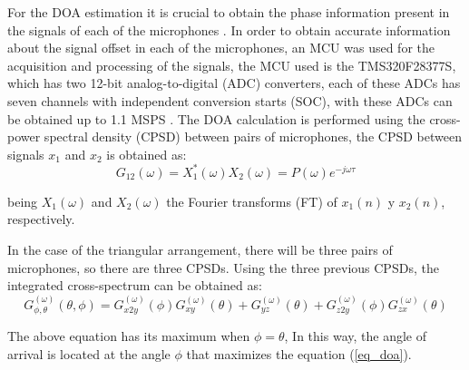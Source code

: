 \documentclass{llncs}
\begin{document}
For the DOA estimation it is crucial to obtain the phase information present in the signals of each of the microphones \cite{karbasi2006}. In order to obtain accurate information about the signal offset in each of the microphones, an MCU was used for the acquisition and processing of the signals, the MCU used is the TMS320F28377S, which has two 12-bit analog-to-digital (ADC) converters, each of these ADCs has seven channels with independent conversion starts (SOC), with these ADCs can be obtained up to 1.1 MSPS \cite{DTASHT2}. The DOA calculation is performed using the cross-power spectral density (CPSD) between pairs of microphones, the CPSD between signals  $x_1$ and $x_2$ is obtained as:
\begin{equation}
	G_{12}(\omega) = X_1^{*}(\omega) X_2(\omega) = P(\omega)e^{-j\omega \tau}
\end{equation} 

being $X_1(\omega)$ and $X_2(\omega)$ the Fourier transforms (FT) of $x_1(n)$ y $x_2(n)$, respectively.%
%

In the case of the triangular arrangement, there will be three pairs of microphones, so there are three CPSDs. Using the three previous CPSDs, the integrated cross-spectrum can be obtained as:
\begin{equation} \label{eq_doa}
	G_{\phi,\theta}^{(\omega)} (\theta,\phi) = G_{x2y}^{(\omega)}(\phi)G_{xy}^{(\omega)}(\theta)+G_{yz}^{(\omega)}(\theta)+G_{z2y}^{(\omega)}(\phi)G_{zx}^{(\omega)}(\theta)
\end{equation}


The above equation has its maximum when $\phi=\theta$, In this way, the angle of arrival is located at the angle $\phi$ that maximizes the equation (\ref{eq_doa}).

\end{document}
